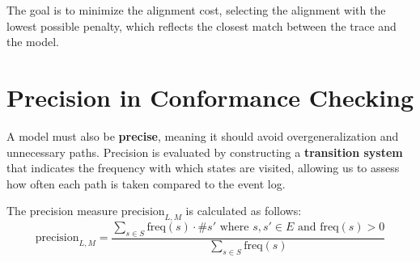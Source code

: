 The goal is to minimize the alignment cost, selecting the alignment with the lowest possible penalty, which reflects the closest match between the trace and the model.

\section{Precision in Conformance Checking}

A model must also be \textbf{precise}, meaning it should avoid overgeneralization and unnecessary paths. Precision is evaluated by constructing a \textbf{transition system} that indicates the frequency with which states are visited, allowing us to assess how often each path is taken compared to the event log.

The precision measure \( \text{precision}_{L, M} \) is calculated as follows:
\[
\text{precision}_{L, M} = \frac{\sum_{s \in S} \text{freq}(s) \cdot \#s' \text{ where } s, s' \in E \text{ and } \text{freq}(s) > 0}{\sum_{s \in S} \text{freq}(s)}
\]